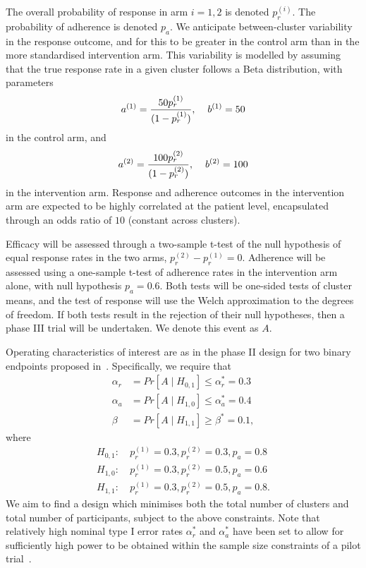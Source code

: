 \documentclass{article} %
\begin{document}
The overall probability of response in arm $i=1,2$ is denoted $p_{r}^{(i)}$. The probability of adherence is denoted $p_{a}$. We anticipate between-cluster variability in the response outcome, and for this to be greater in the control arm than in the more standardised intervention arm. This variability is modelled by assuming that the true response rate in a given cluster follows a Beta distribution, with parameters
\begin{equation}
a^{(1)} = \frac{50 p_{r}^{(1)}}{(1-p_{r}^{(1)})}, \hspace{4mm} b^{(1)} = 50
\end{equation}
in the control arm, and
\begin{equation}
a^{(2)} = \frac{100 p_{r}^{(2)}}{(1-p_{r}^{(2)})}, \hspace{4mm} b^{(2)} = 100
\end{equation}
in the intervention arm. Response and adherence outcomes in the intervention arm are expected to be highly correlated at the patient level, encapsulated through an odds ratio of $10$ (constant across clusters).

Efficacy will be assessed through a two-sample t-test of the null hypothesis of equal response rates in the two arms, $p_{r}^{(2)} - p_{r}^{(1)} = 0$. Adherence will be assessed using a one-sample t-test of adherence rates in the intervention arm alone, with null hypothesis $p_{a} = 0.6$. Both tests will be one-sided tests of cluster means, and the test of response will use the Welch approximation to the degrees of freedom. If both tests result in the rejection of their null hypotheses, then a phase III trial will be undertaken. We denote this event as $A$.

Operating characteristics of interest are as in the phase II design for two binary endpoints proposed in~\cite{Bryant1995}. Specifically, we require that
\begin{align}
\alpha_{r} &= Pr[A \mid H_{0,1}] \leq \alpha_{r}^{*} = 0.3 \\
\alpha_{a} &= Pr[A \mid H_{1,0}] \leq \alpha_{a}^{*} = 0.4 \\
\beta &= Pr[A \mid H_{1,1}] \geq \beta^{*} = 0.1,
\end{align}
where
\begin{align}
H_{0,1}:& ~p_{r}^{(1)} = 0.3, p_{r}^{(2)} = 0.3, p_{a} = 0.8 \\
H_{1,0}:& ~p_{r}^{(1)} = 0.3, p_{r}^{(2)} = 0.5, p_{a} = 0.6 \\
H_{1,1}:& ~p_{r}^{(1)} = 0.3, p_{r}^{(2)} = 0.5, p_{a} = 0.8.
\end{align}
We aim to find a design which minimises both the total number of clusters and total number of participants, subject to the above constraints. Note that relatively high nominal type I error rates $\alpha_{r}^{*}$ and $\alpha_{a}^{*}$ have been set to allow for sufficiently high power to be obtained within the sample size constraints of a pilot trial~\cite{Lee2014}.
\end{document}
